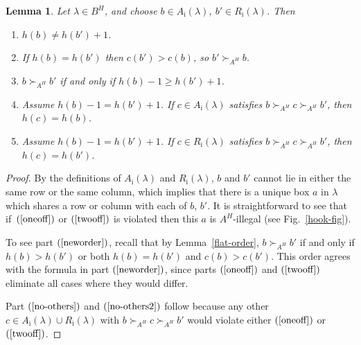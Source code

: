 \documentclass[11pt]{article}
\newtheorem{Lemma}[Theorem]{Lemma}
\theoremstyle{definition}
\begin{document}
\begin{Lemma} \label{when-illegal}
Let $\lambda \in B^H$, and choose $b \in A_{\bar \imath}(\lambda)$, $b' \in R_{\bar \imath}(\lambda)$. Then
\begin{enumerate}\itemsep=0pt
\item \label{oneoff} $h(b) \neq h(b')+1$.

\item \label{twooff} If $h(b)= h(b')$ then $c(b') >c(b)$, so $b' \succ_{A^H} b$.


\item \label{neworder} $b \succ_{A^H} b'$ if and only if $h(b)-1 \geq h(b')+1$.

\item \label{no-others} Assume $h(b)-1=h(b')+1$. If $c \in A_{\bar \imath}(\lambda)$ satisfies $b \succ_{A^H} c \succ_{A^H} b'$, then $h(c)=h(b)$.

\item \label{no-others2} Assume $h(b)-1=h(b')+1$. If $c \in R_{\bar \imath}(\lambda)$ satisfies $b \succ_{A^H} c \succ_{A^H} b'$, then $h(c)=h(b')$.
\end{enumerate}
\end{Lemma}

\begin{proof}
By the def\/initions of $A_{\bar \imath}(\lambda)$ and $R_{\bar \imath}(\lambda)$, $b$ and $b'$ cannot lie in either the same row or the same column, which implies that there is a unique box $a$ in $\lambda$ which shares a row or column with each of $b$, $b'$. It is straightforward to see that  if~$(\ref{oneoff})$ or $(\ref{twooff})$ is violated then this $a$ is $A^H$-illegal (see Fig.~\ref{hook-fig}).

To see part $(\ref{neworder})$, recall that by Lemma~\ref{flat-order}, $b \succ_{A^H} b'$ if and only if $h(b) > h(b')$ or both $h(b)=h(b')$ and $c(b)> c(b')$. This order agrees with the formula in part $(\ref{neworder})$, since parts $(\ref{oneoff})$ and $(\ref{twooff})$ eliminate all cases where they would dif\/fer.

Part $(\ref{no-others})$ and $(\ref{no-others2})$ follow because any other $c \in A_{\bar \imath}(\lambda) \cup R_{\bar \imath}(\lambda)$ with $b \succ_{A^H} c \succ_{A^H} b'$ would violate either $(\ref{oneoff})$ or $(\ref{twooff})$.
\end{proof}
\end{document}
